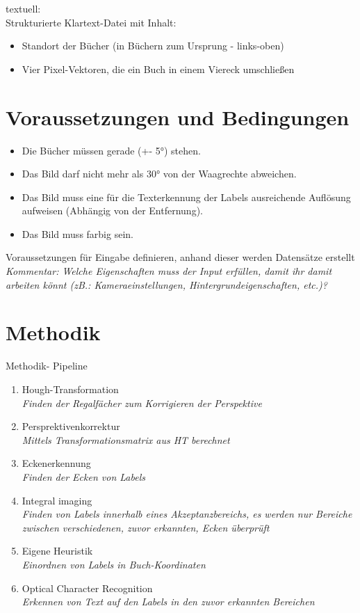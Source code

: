 \documentclass[deutsch]{scrartcl}
\begin{document}
\noindent textuell:\\
Strukturierte Klartext-Datei mit Inhalt:
\begin{itemize}
  \item Standort der Bücher (in Büchern zum Ursprung - links-oben)
  \item Vier Pixel-Vektoren, die ein Buch in einem Viereck umschließen
\end{itemize}

\section{Voraussetzungen und Bedingungen}

\begin{itemize}
  \item Die Bücher müssen gerade (+- 5°) stehen.
  \item Das Bild darf nicht mehr als 30° von der Waagrechte abweichen.
  \item Das Bild muss eine für die Texterkennung der Labels ausreichende Auflösung aufweisen (Abhängig von der Entfernung).
  \item Das Bild muss farbig sein.
\end{itemize}

Voraussetzungen für Eingabe definieren, anhand dieser werden Datensätze erstellt\\
\textit{Kommentar: Welche Eigenschaften muss der Input erfüllen, damit ihr damit arbeiten könnt (zB.: Kameraeinstellungen, Hintergrundeigenschaften, etc.)?}
\section{Methodik}
Methodik- Pipeline
\begin{enumerate}
	\item Hough-Transformation\\
		\textit{Finden der Regalfächer zum Korrigieren der Perspektive}
	\item Persprektivenkorrektur\\
		\textit{Mittels Transformationsmatrix aus HT berechnet}
	\item Eckenerkennung\\
		\textit{Finden der Ecken von Labels}
	\item Integral imaging\\
		\textit{Finden von Labels innerhalb eines Akzeptanzbereichs, es werden nur Bereiche zwischen verschiedenen, zuvor erkannten, Ecken überprüft}
	\item Eigene Heuristik\\
		\textit{Einordnen von Labels in Buch-Koordinaten}
	\item Optical Character Recognition\\
		\textit{Erkennen von Text auf den Labels in den zuvor erkannten Bereichen}
\end{enumerate}
\end{document}
